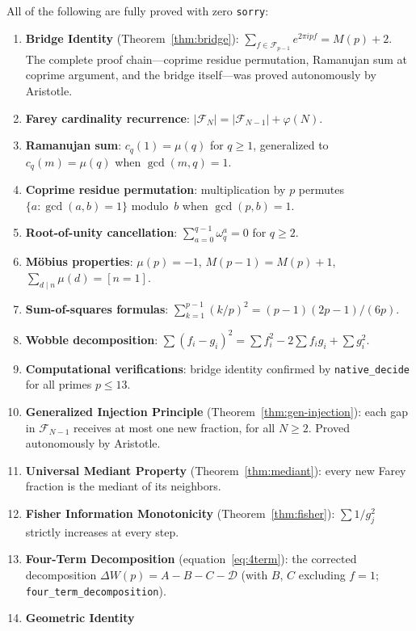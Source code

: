 \documentclass[11pt]{article}
\theoremstyle{definition}
\newcommand{\F}{\mathcal{F}}
\begin{document}
All of the following are fully proved with zero \texttt{sorry}:
\begin{enumerate}
  \item \textbf{Bridge Identity} (Theorem~\ref{thm:bridge}):
    $\sum_{f \in \F_{p-1}} e^{2\pi ipf} = M(p) + 2$.
    The complete proof chain---coprime residue permutation,
    Ramanujan sum at coprime argument, and the bridge
    itself---was proved autonomously by Aristotle.
  \item \textbf{Farey cardinality recurrence}:
    $|\F_N| = |\F_{N-1}| + \varphi(N)$.
  \item \textbf{Ramanujan sum}: $c_q(1) = \mu(q)$ for $q \ge 1$,
    generalized to $c_q(m) = \mu(q)$ when $\gcd(m,q) = 1$.
  \item \textbf{Coprime residue permutation}:
    multiplication by $p$ permutes $\{a : \gcd(a,b) = 1\}$
    modulo~$b$ when $\gcd(p,b) = 1$.
  \item \textbf{Root-of-unity cancellation}:
    $\sum_{a=0}^{q-1}\omega_q^a = 0$ for $q \ge 2$.
  \item \textbf{M\"obius properties}: $\mu(p) = -1$,
    $M(p-1) = M(p) + 1$, $\sum_{d \mid n}\mu(d) = [n=1]$.
  \item \textbf{Sum-of-squares formulas}:
    $\sum_{k=1}^{p-1}(k/p)^2 = (p-1)(2p-1)/(6p)$.
  \item \textbf{Wobble decomposition}:
    $\sum (f_i - g_i)^2 = \sum f_i^2 - 2\sum f_i g_i + \sum g_i^2$.
  \item \textbf{Computational verifications}:
    bridge identity confirmed by \texttt{native\_decide} for
    all primes $p \le 13$.
  \item \textbf{Generalized Injection Principle}
    (Theorem~\ref{thm:gen-injection}):
    each gap in $\F_{N-1}$ receives at most one new fraction,
    for all $N \ge 2$.  Proved autonomously by Aristotle.
  \item \textbf{Universal Mediant Property}
    (Theorem~\ref{thm:mediant}):
    every new Farey fraction is the mediant of its neighbors.
  \item \textbf{Fisher Information Monotonicity}
    (Theorem~\ref{thm:fisher}):
    $\sum 1/g_j^2$ strictly increases at every step.
  \item \textbf{Four-Term Decomposition}
    (equation~\eqref{eq:4term}):
    the corrected decomposition
    $\Delta W(p) = A - B - C - \mathcal{D}$
    (with $B$, $C$ excluding $f = 1$;
    \texttt{four\_term\_decomposition}).
  \item \textbf{Geometric Identity}

\end{enumerate}
\end{document}
